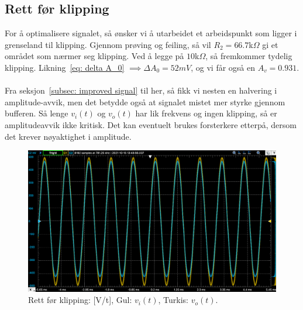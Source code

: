 \documentclass[a4paper,11pt,norsk]{article}
\begin{document}
\subsection{Rett før klipping}\label{subsec: klipping signal}
For å optimalisere signalet, så ønsker vi å utarbeidet et arbeidspunkt som ligger i grenseland til klipping.
Gjennom prøving og feiling, så vil $R_2 = 66.7$k$\Omega$ gi et området som nærmer seg klipping. Ved å legge på $10$k$\Omega$, så fremkommer tydelig klipping.
Likning~\ref{eq: delta A_0} $\implies \Delta A_0 = 52mV$,
og vi får også en $A_v = 0.931$.
\\\\
Fra seksjon~\ref{subsec: improved signal} til her, så fikk vi nesten en halvering i amplitude-avvik, men det betydde også at signalet mistet mer styrke gjennom bufferen. Så lenge $v_i(t)$ og $v_o(t)$ har lik frekvens og ingen klipping, så er amplitudeavvik ikke kritisk. Det kan eventuelt brukes forsterkere etterpå, dersom det krever nøyaktighet i amplitude.
\begin{figure}[htbp]
    \centering
    \includegraphics[width=1.0\textwidth]{img/Right before clipping.png}
    \caption{Rett før klipping: [V/t], Gul: $v_i(t)$, Turkis: $v_o(t)$.}
    \label{fig: right before clipping}
\end{figure}\\
\end{document}
